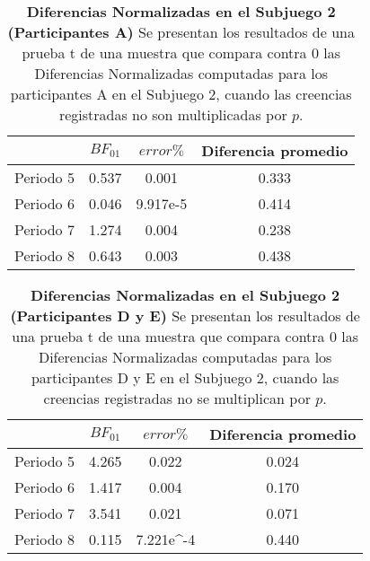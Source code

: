 \begin{table}[h]
\caption[Diferencias Normalizadas en el Subjuego 2 omitiendo la multiplicación por $p$; Participante A (Pruebas t de una muestra)]{\textbf{Diferencias Normalizadas en el Subjuego 2 (Participantes A)} Se presentan los resultados de una prueba t de una muestra que compara contra 0 las Diferencias Normalizadas computadas para los participantes A en el Subjuego 2, cuando las creencias registradas no son multiplicadas por $p$.}
\label{DNnop-S2-A-B}
\centering
\begin{tabular}{l | c c | c}
\toprule
\textbf{} & \textbf{$BF_{01}$} & \textbf{$error\%$} & \textbf{Diferencia promedio}\\
\midrule
Periodo 5 & 0.537 & 0.001 & 0.333\\
Periodo 6 & 0.046 & 9.917e-5 & 0.414\\
Periodo 7 & 1.274 & 0.004 & 0.238\\
Periodo 8 & 0.643 & 0.003 & 0.438\\
\bottomrule
\end{tabular}
\end{table}


\begin{table}[h]
\caption[Diferencias Normalizadas en el Subjuego 2, omitiendo la multiplicación por $p$; Participantes D y E (Pruebas t de una muestra)]{\textbf{Diferencias Normalizadas en el Subjuego 2 (Participantes D y E)} Se presentan los resultados de una prueba t de una muestra que compara contra 0 las Diferencias Normalizadas computadas para los participantes D y E en el Subjuego 2, cuando las creencias registradas no se multiplican por $p$.}
\label{DNnop-S2-DyE-B}
\centering
\begin{tabular}{l | c c | c}
\toprule
\textbf{} & \textbf{$BF_{01}$} & \textbf{$error\%$} & \textbf{Diferencia promedio}\\
\midrule
Periodo 5 & 4.265 & 0.022 & 0.024\\
Periodo 6 & 1.417 & 0.004 & 0.170\\
Periodo 7 & 3.541 & 0.021 & 0.071\\
Periodo 8 & 0.115 & 7.221e^-4 & 0.440\\
\bottomrule
\end{tabular}
\end{table}
  

